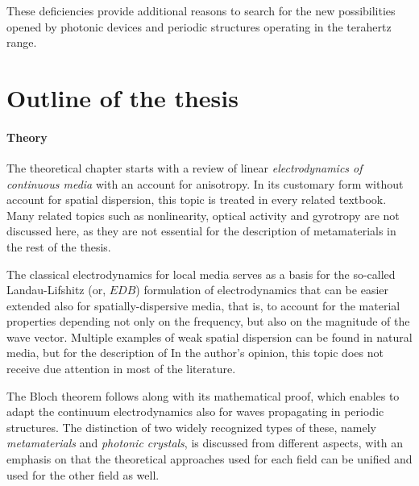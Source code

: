 These deficiencies provide additional reasons to search for the new possibilities opened by photonic devices and periodic structures operating in the terahertz range.  

\section{Outline of the thesis} %
\paragraph{Theory} %
The theoretical chapter starts with a review of linear \textit{electrodynamics of continuous media} with an account for anisotropy. In its customary form without account for spatial dispersion, this topic is treated in every related textbook. Many related topics such as nonlinearity, optical activity and gyrotropy are not discussed here, as they are not essential for the description of metamaterials in the rest of the thesis.  

The classical electrodynamics for local media serves as a basis for the so-called Landau-Lifshitz (or, $EDB$) formulation of electrodynamics that can be easier extended also for spatially-dispersive media, that is, to account for the material properties depending not only on the frequency, but also on the magnitude of the wave vector.
Multiple examples of weak spatial dispersion can be found in natural media, but for the description of  
In the author's opinion, this topic does not receive due attention in most of the literature.

The Bloch theorem follows along with its mathematical proof, which enables to adapt the continuum electrodynamics also for waves propagating in periodic structures. 
The distinction of two widely recognized types of these, namely \textit{metamaterials} and \textit{photonic crystals}, is discussed from different aspects, with an emphasis on that the theoretical approaches used for each field can be unified and used for the other field as well.

